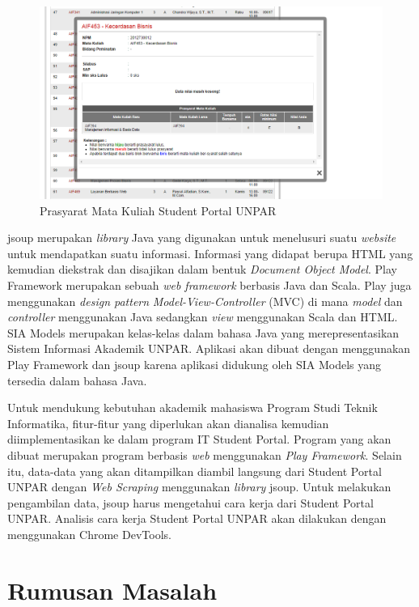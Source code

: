 \begin{figure}
	\centering
	\includegraphics[scale=0.5]{Gambar/contoh-portal}
	\caption{Prasyarat Mata Kuliah Student Portal UNPAR}
	\label{fig:1_prasyarat_student_portal}
\end{figure}

jsoup\cite{jsoup} merupakan \textit{library} Java yang digunakan untuk menelusuri suatu \textit{website} untuk mendapatkan suatu informasi. Informasi yang didapat berupa HTML yang kemudian diekstrak dan disajikan dalam bentuk \textit{Document Object Model}. Play Framework\cite{Leroux:2014} merupakan sebuah \textit{web framework} berbasis Java dan Scala. Play juga menggunakan \textit{design pattern} \textit{Model-View-Controller} (MVC) di mana \textit{model} dan \textit{controller} menggunakan Java sedangkan \textit{view} menggunakan Scala dan HTML. SIA Models\cite{siamodels} merupakan kelas-kelas dalam bahasa Java yang merepresentasikan Sistem Informasi Akademik UNPAR. Aplikasi akan dibuat dengan menggunakan Play Framework dan jsoup karena aplikasi didukung oleh SIA Models yang tersedia dalam bahasa Java. 

Untuk mendukung kebutuhan akademik mahasiswa Program Studi Teknik Informatika, fitur-fitur yang diperlukan akan dianalisa kemudian diimplementasikan ke dalam program IT Student Portal. Program yang akan dibuat merupakan program berbasis \textit{web} menggunakan \textit{Play Framework}. Selain itu, data-data yang akan ditampilkan diambil langsung dari Student Portal UNPAR dengan \textit{Web Scraping} menggunakan \textit{library} jsoup. Untuk melakukan pengambilan data, jsoup harus mengetahui cara kerja dari Student Portal UNPAR. Analisis cara kerja Student Portal UNPAR akan dilakukan dengan menggunakan Chrome DevTools. 

\section{Rumusan Masalah}
\label{sec:rumusan_masalah}

